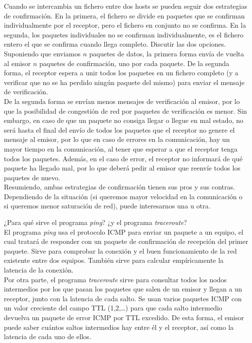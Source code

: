 \begin{ejercicio}
    Cuando se intercambia un fichero entre dos hosts se pueden seguir dos estrategias de confirmación. En la primera, el fichero se divide en paquetes que se confirman individualmente por el receptor, pero el fichero en conjunto no se confirma. En la segunda, los paquetes individuales no se confirman individualmente, es el fichero entero el que se confirma cuando llega completo. Discutir las dos opciones.\\

    Suponiendo que enviamos $n$ paquetes de datos, la primera forma envía de vuelta al emisor $n$ paquetes de confirmación, uno por cada paquete. De la segunda forma, el receptor espera a unir todos los paquetes en un fichero completo (y a verificar que no se ha perdido ningún paquete del mismo) para enviar el mensaje de verificación.\\

    De la segunda forma se envían menos mensajes de verificación al emisor, por lo que la posibilidad de congestión de red por paquetes de verificación es menor. Sin embargo, en caso de que un paquete no consiga llegar o llegue en mal estado, no será hasta el final del envío de todos los paquetes que el receptor no genere el mensaje al emisor, por lo que en caso de errores en la comunicación, hay un mayor tiempo en la comunicación, al tener que esperar a que el receptor tenga todos los paquetes. Además, en el caso de error,
    el receptor no informará de qué paquete ha llegado mal, por lo que deberá pedir al emisor que reenvíe todos los paquetes de nuevo.\\

    Resumiendo, ambas estrategias de confirmación tienen sus pros y sus contras. Dependiendo de la situación (si queremos mayor velocidad en la comunicación o si queremos menor saturación de red), puede interesarnos una u otra.
\end{ejercicio}

\begin{ejercicio}
   ¿Para qué sirve el programa \textit{ping}? ¿y el programa \textit{traceroute}? \\

   El programa \textit{ping} usa el protocolo \acrshort{ICMP} para enviar un paquete a un equipo, el cual tratará de responder con un paquete de confirmación de recepción del primer paquete. Sirve para comprobar la conexión y el buen funcionamiento de la red existente entre dos equipos. También sirve para calcular empíricamente la latencia de la conexión.\\

   Por otra parte, el programa \textit{traceroute} sirve para consultar todos los nodos intermedios por los que pasan los paquetes que salen de un emisor y llegan a un receptor, junto con la latencia de cada salto. Se usan varios paquetes \acrshort{ICMP} con un valor creciente del campo \acrshort{TTL} (1,2,\dots) para que cada salto intermedio devuelva un paquete de error \acrshort{ICMP} por \acrshort{TTL} excedido. De esta forma, el emisor puede saber cuántos saltos intermedios hay entre él y el receptor, así como la latencia de cada uno de ellos.
\end{ejercicio}

